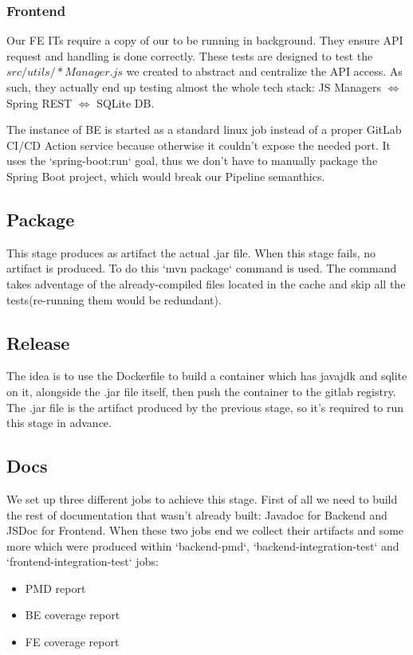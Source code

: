 \documentclass[a4paper,10pt]{scrartcl}
\begin{document}
\subsubsection{Frontend}

Our FE ITs require a copy of our to be running in background. They ensure API request and handling is done correctly. These tests are designed to test the $src/utils/*Manager.js$ we created to abstract and centralize the API access. As such, they actually end up testing almost the whole tech stack: JS Managers $\Leftrightarrow$ Spring REST $\Leftrightarrow$ SQLite DB.

The instance of BE is started as a standard linux job instead of a proper GitLab CI/CD Action service because otherwise it couldn't expose the needed port. It uses the `spring-boot:run` goal, thus we don't have to manually package the Spring Boot project, which would break our Pipeline semanthics.

\subsection{Package}

This stage produces as artifact the actual .jar file. When this stage fails, no artifact is produced.
To do this `mvn package` command is used. The command takes adventage of the already-compiled files located in the cache and skip all the tests(re-running them would be redundant).

\subsection{Release}

The idea is to use the Dockerfile to build a container which has javajdk and sqlite on it, alongside the .jar file itself, then push the container to the gitlab registry. The .jar file is the artifact produced by the previous stage, so it's required to run this stage in advance.

\subsection{Docs}

We set up three different jobs to achieve this stage. First of all we need to build the rest of documentation that wasn't already built: Javadoc for Backend and JSDoc for Frontend. When these two jobs end we collect their artifacts and some more which were produced within `backend-pmd`, `backend-integration-test` and `frontend-integration-test` jobs:
\begin{itemize}
    \item PMD report
    \item BE coverage report
    \item FE coverage report
\end{itemize}
\end{document}
